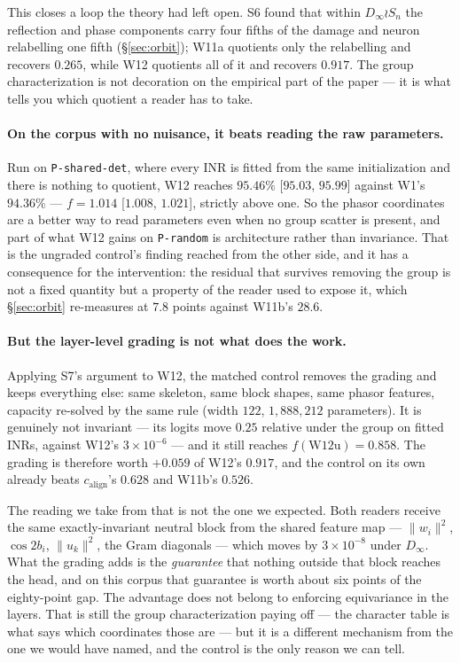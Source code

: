 \documentclass[10pt,letterpaper]{article}
\theoremstyle{definition}
\newcommand{\Dinf}{D_\infty}
\newcommand{\calign}{c_{\mathrm{align}}}
\begin{document}
This closes a loop the theory had left open. S6 found that within $\Dinf\wr S_n$ the reflection and
phase components carry four fifths of the damage and neuron relabelling one fifth
(\S\ref{sec:orbit}); W11a quotients only the relabelling and recovers $0.265$, while W12 quotients
all of it and recovers $0.917$. The group characterization is not decoration on the empirical part
of the paper --- it is what tells you which quotient a reader has to take.

\paragraph{On the corpus with no nuisance, it beats reading the raw parameters.} Run on
\texttt{P-shared-det}, where every INR is fitted from the same initialization and there is nothing
to quotient, W12 reaches $95.46\%$ [$95.03$, $95.99$] against W1's $94.36\%$ --- $f = 1.014$
[$1.008$, $1.021$], strictly above one. So the phasor coordinates are a better way to read
parameters even when no group scatter is present, and part of what W12 gains on \texttt{P-random} is
architecture rather than invariance. That is the ungraded control's finding reached from the other
side, and it has a consequence for the intervention: the residual that survives removing the group
is not a fixed quantity but a property of the reader used to expose it, which \S\ref{sec:orbit}
re-measures at $7.8$ points against W11b's $28.6$.

\paragraph{But the layer-level grading is not what does the work.} Applying S7's argument to W12,
the matched control removes the grading and keeps everything else: same skeleton, same block shapes,
same phasor features, capacity re-solved by the same rule (width $122$, $1{,}888{,}212$ parameters).
It is genuinely not invariant --- its logits move $0.25$ relative under the group on fitted INRs,
against W12's $3\times10^{-6}$ --- and it still reaches $f(\mathrm{W12u}) = \mathbf{0.858}$. The
grading is therefore worth $+0.059$ of W12's $0.917$, and the control on its own already beats
$\calign$'s $0.628$ and W11b's $0.526$.

The reading we take from that is not the one we expected. Both readers receive the same
exactly-invariant neutral block from the shared feature map --- $\|w_i\|^2$, $\cos 2b_i$,
$\|u_k\|^2$, the Gram diagonals --- which moves by $3\times10^{-8}$ under $\Dinf$. What the grading
adds is the \emph{guarantee} that nothing outside that block reaches the head, and on this corpus
that guarantee is worth about six points of the eighty-point gap. The advantage does not belong to
enforcing equivariance in the layers. That is still the group characterization paying off --- the
character table is what says which coordinates those are --- but it is a different mechanism from
the one we would have named, and the control is the only reason we can tell.
\end{document}
